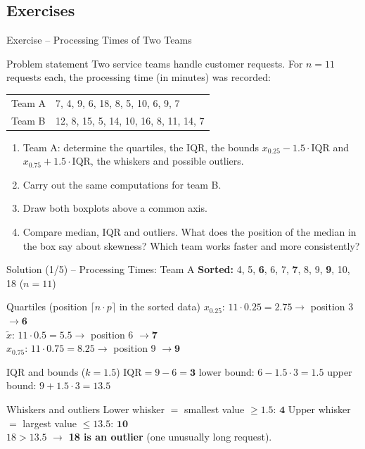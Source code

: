 \documentclass[aspectratio=169,11pt]{beamer}
\begin{document}
\subsection{Exercises}
\begin{frame}{Exercise -- Processing Times of Two Teams}
  \begin{block}{Problem statement}
    Two service teams handle customer requests. For $n = 11$ requests each,
    the processing time (in minutes) was recorded:
    \begin{center}
      \begin{tabular}{ll}
        \toprule
        Team A & 7, 4, 9, 6, 18, 8, 5, 10, 6, 9, 7 \\
        Team B & 12, 8, 15, 5, 14, 10, 16, 8, 11, 14, 7 \\
        \bottomrule
      \end{tabular}
    \end{center}
    \begin{enumerate}
      \item Team A: determine the quartiles, the IQR, the bounds
        $x_{0.25} - 1.5 \cdot \text{IQR}$ and $x_{0.75} + 1.5 \cdot \text{IQR}$,
        the whiskers and possible outliers.
      \item Carry out the same computations for team B.
      \item Draw both boxplots above a common axis.
      \item Compare median, IQR and outliers. What does the position of the
        median in the box say about skewness? Which team works faster and more
        consistently?
    \end{enumerate}
  \end{block}
\end{frame}

\begin{frame}{Solution (1/5) -- Processing Times: Team A}
  \textbf{Sorted:} 4, 5, \textbf{6}, 6, 7, \textbf{7}, 8, 9, \textbf{9}, 10, 18 \quad ($n = 11$)
  \begin{block}{Quartiles (position $\lceil n \cdot p \rceil$ in the sorted data)}
    $x_{0.25}$: $11 \cdot 0.25 = 2.75 \rightarrow$ position 3 $\rightarrow \mathbf{6}$ \\
    $\tilde{x}$: $11 \cdot 0.5 = 5.5 \rightarrow$ position 6 $\rightarrow \mathbf{7}$ \\
    $x_{0.75}$: $11 \cdot 0.75 = 8.25 \rightarrow$ position 9 $\rightarrow \mathbf{9}$
  \end{block}
  \begin{block}{IQR and bounds ($k = 1.5$)}
    $\text{IQR} = 9 - 6 = \mathbf{3}$ \qquad
    lower bound: $6 - 1.5 \cdot 3 = \mathbf{1.5}$ \qquad
    upper bound: $9 + 1.5 \cdot 3 = \mathbf{13.5}$
  \end{block}
  \begin{block}{Whiskers and outliers}
    Lower whisker $=$ smallest value $\ge 1.5$: $\mathbf{4}$ \qquad
    Upper whisker $=$ largest value $\le 13.5$: $\mathbf{10}$ \\
    $18 > 13.5$ $\rightarrow$ \textbf{18 is an outlier} (one unusually long request).
  \end{block}
\end{frame}
\end{document}
